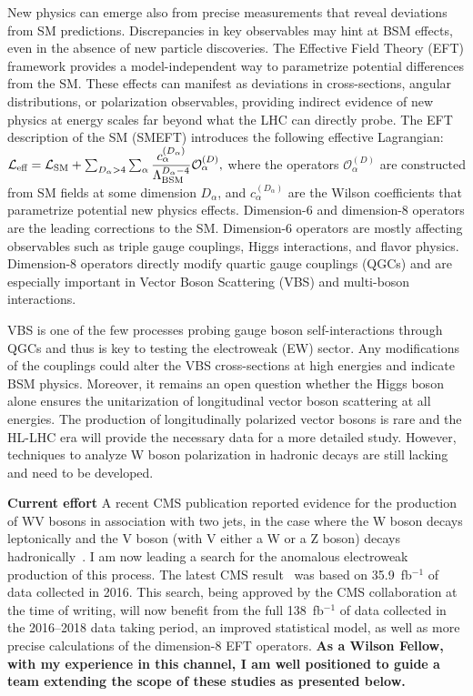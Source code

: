 {\begin{flushleft}
New physics can emerge also from precise measurements that reveal deviations from SM predictions. Discrepancies in key observables may hint at BSM effects, even in the absence of new particle discoveries. The Effective Field Theory (EFT) framework provides a model-independent way to parametrize potential differences from the SM. These effects can manifest as deviations in cross-sections, angular distributions, or polarization observables, providing indirect evidence of new physics at energy scales far beyond what the LHC can directly probe.
The EFT description of the SM (SMEFT) introduces the following effective Lagrangian:
\begin{math}
    \mathcal{L}_{\text{eff}} = \mathcal{L}_{\text{SM}} + \sum_{D_\alpha>4}\sum_{\alpha}\dfrac{c_\alpha^{(D_\alpha)}}{\Lambda_{\text{BSM}}^{D_\alpha-4}}\mathcal{O}^{(D)}_\alpha \space,
\end{math}
where the operators $\mathcal{O}_\alpha^{(D)}$ are constructed from SM fields at some dimension $D_\alpha$, and $c_\alpha^{(D_\alpha)}$ are the Wilson coefficients that parametrize potential new physics effects. Dimension-6 and dimension-8 operators are the leading corrections to the SM. Dimension-6 operators are mostly affecting observables such as triple gauge couplings, Higgs interactions, and flavor physics. Dimension-8 operators directly modify quartic gauge couplings (QGCs) and are especially important in Vector Boson Scattering (VBS) and multi-boson interactions. 

VBS is one of the few processes probing gauge boson self-interactions through QGCs and thus is key to testing the electroweak (EW) sector. Any modifications of the couplings could alter the VBS cross-sections at high energies and indicate BSM physics.  
Moreover, it remains an open question whether the Higgs boson alone ensures the unitarization of longitudinal vector boson scattering at all energies. The production of longitudinally polarized vector bosons is rare and the HL-LHC era will provide the necessary data for a more detailed study. However, techniques to analyze W boson polarization in hadronic decays are still lacking and need to be developed.

\textbf{Current effort}
A recent CMS publication reported evidence for the production of WV bosons in association with two jets, in the case where the W boson decays leptonically and the V boson (with V either a W or a Z boson) decays hadronically~\cite{[2]}. I am now leading a search for the anomalous electroweak production of this process. The latest CMS result~\cite{[3]} was based on 35.9~fb$^{-1}$ of data collected in 2016. This search, being approved by the CMS collaboration at the time of writing, will now benefit from the full 138~fb$^{-1}$ of data collected in the 2016--2018 data taking period, an improved statistical model, as well as more precise calculations of the dimension-8 EFT operators. {\bf As a Wilson Fellow, with my experience in this channel, I am well positioned to guide a team extending the scope of these studies as presented below.}


\end{flushleft}}
